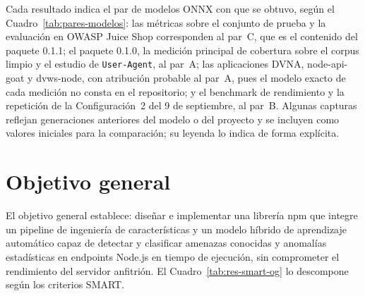 Cada resultado indica el par de modelos ONNX con que se obtuvo, según el
Cuadro~\ref{tab:pares-modelos}: las métricas sobre el conjunto de prueba y la evaluación en OWASP
Juice Shop corresponden al par~C, que es el contenido del paquete 0.1.1; el paquete 0.1.0, la
medición principal de cobertura sobre el corpus limpio y el estudio de \texttt{User-Agent}, al
par~A; las aplicaciones DVNA, node-api-goat y
dvws-node, con atribución probable al par~A, pues el modelo exacto de cada medición no consta en el
repositorio; y el benchmark de rendimiento y la repetición de la Configuración~2 del 9 de
septiembre, al par~B. Algunas
capturas reflejan generaciones anteriores del modelo o del proyecto y se incluyen como valores
iniciales para la comparación; su leyenda lo indica de forma explícita.

\section{Objetivo general}
\label{sec:res-og}

El objetivo general establece: diseñar e implementar una librería npm que integre un pipeline de
ingeniería de características y un modelo híbrido de aprendizaje automático capaz de detectar y
clasificar amenazas conocidas y anomalías estadísticas en endpoints Node.js en tiempo de
ejecución, sin comprometer el rendimiento del servidor anfitrión. El Cuadro~\ref{tab:res-smart-og}
lo descompone según los criterios SMART.

